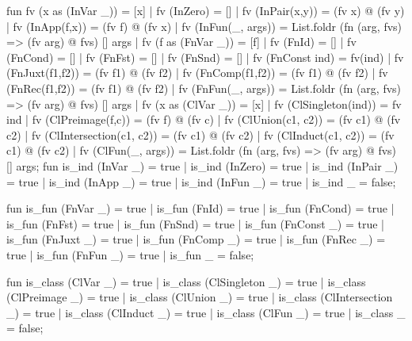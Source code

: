 \nwenddocs{}\endmoddef\nwstartdeflinemarkup{}\nwenddeflinemarkup
fun fv (x as (InVar _)) = [x]
  | fv (InZero) = []
  | fv (InPair(x,y)) = (fv x) @ (fv y)
  | fv (InApp(f,x)) = (fv f) @ (fv x)
  | fv (InFun(_, args)) = List.foldr (fn (arg, fvs) => (fv arg) @ fvs) 
                                     []
                                     args
  | fv (f as (FnVar _)) = [f]
  | fv (FnId) = []
  | fv (FnCond) = []
  | fv (FnFst) = []
  | fv (FnSnd) = []
  | fv (FnConst ind) = fv(ind)
  | fv (FnJuxt(f1,f2)) = (fv f1) @ (fv f2)
  | fv (FnComp(f1,f2)) = (fv f1) @ (fv f2)
  | fv (FnRec(f1,f2)) = (fv f1) @ (fv f2)
  | fv (FnFun(_, args)) = List.foldr (fn (arg, fvs) => (fv arg) @ fvs) 
                                     []
                                     args
  | fv (x as (ClVar _)) = [x]
  | fv (ClSingleton(ind)) = fv ind
  | fv (ClPreimage(f,c)) = (fv f) @ (fv c)
  | fv (ClUnion(c1, c2)) = (fv c1) @ (fv c2)
  | fv (ClIntersection(c1, c2)) = (fv c1) @ (fv c2)
  | fv (ClInduct(c1, c2)) = (fv c1) @ (fv c2)
  | fv (ClFun(_, args)) = List.foldr (fn (arg, fvs) => (fv arg) @ fvs) 
                                     []
                                     args;
\eatline
{}\nwendcode{}\nwdocspar
\nwenddocs{}\endmoddef\nwstartdeflinemarkup{}\nwenddeflinemarkup
fun is_ind (InVar _) = true
  | is_ind (InZero) = true
  | is_ind (InPair _) = true
  | is_ind (InApp _) = true
  | is_ind (InFun _) = true
  | is_ind _ = false;

fun is_fun (FnVar _) = true
  | is_fun (FnId) = true
  | is_fun (FnCond) = true
  | is_fun (FnFst) = true
  | is_fun (FnSnd) = true
  | is_fun (FnConst _) = true
  | is_fun (FnJuxt _) = true
  | is_fun (FnComp _) = true
  | is_fun (FnRec _) = true
  | is_fun (FnFun _) = true
  | is_fun _ = false;

fun is_class (ClVar _) = true
  | is_class (ClSingleton _) = true
  | is_class (ClPreimage _) = true
  | is_class (ClUnion _) = true
  | is_class (ClIntersection _) = true
  | is_class (ClInduct _) = true
  | is_class (ClFun _) = true
  | is_class _ = false;

